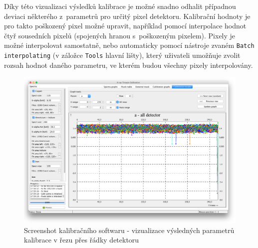 Díky této vizualizaci výsledků kalibrace je možné snadno odhalit případnou deviaci některého z~parametrů pro určitý pixel detektoru. Kalibrační hodnoty je pro takto poškozený pixel možné upravit, například pomocí interpolace hodnot čtyř sousedních pixelů (spojených hranou s~poškozeným pixelem). Pixely je možné interpolovat samostatně, nebo automaticky pomocí nástroje zvaném \texttt{Batch interpolating} (v záložce \texttt{Tools} hlavní lišty), který uživateli umožňuje zvolit rozsah hodnot daného parametru, ve kterém budou všechny pixely interpolovány.

\begin{figure}[t]
	\begin{center}
		\includegraphics[width=16cm]{figures/calibsw_result.png}
		\caption{Screenshot kalibračního softwaru - vizualizace výsledných parametrů kalibrace v řezu přes řádky detektoru}
		\label{fig:calib:sw_calib_results}
	\end{center}
\end{figure}









